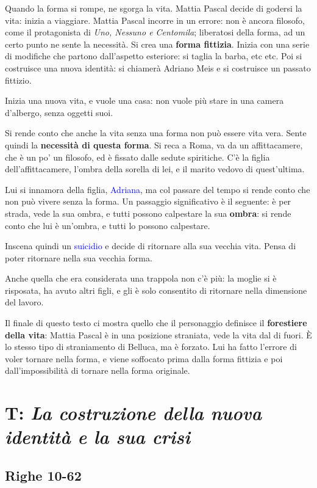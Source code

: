 \documentclass[a4paper, twoside, titlepage]{book}
\newcounter{mar}
\renewcommand{\emph}[1]{\textcolor{blue}{#1}}
\begin{document}
Quando la forma si rompe, ne sgorga la vita. Mattia Pascal decide di godersi la vita: inizia a viaggiare.
Mattia Pascal incorre in un errore: non è ancora filosofo, come il protagonista di \textit{Uno, Nessuno e Centomila}; liberatosi della forma, ad un certo punto ne sente la necessità. Si crea una \textbf{forma fittizia}.
Inizia con una serie di modifiche che partono dall'aspetto esteriore: si taglia la barba, etc etc.
Poi si costruisce una nuova identità: si chiamerà Adriano Meis e si costruisce un passato fittizio.

Inizia una nuova vita, e vuole una casa: non vuole più stare in una camera d'albergo, senza oggetti suoi.

Si rende conto che anche la vita senza una forma non può essere vita vera. Sente quindi la \textbf{necessità di questa forma}.
Si reca a Roma, va da un affittacamere, che è un po' un filosofo, ed è fissato dalle sedute spiritiche.
C'è la figlia dell'affittacamere, l'ombra della sorella di lei, e il marito vedovo di quest'ultima.

Lui si innamora della figlia, \emph{Adriana}, ma col passare del tempo si rende conto che non può vivere senza la forma. Un passaggio significativo è il seguente: è per strada, vede la sua ombra, e tutti possono calpestare la sua \textbf{ombra}: si rende conto che lui è un'ombra, e tutti lo possono calpestare.

Inscena quindi un \emph{suicidio} e decide di ritornare alla sua vecchia vita. Pensa di poter ritornare nella sua vecchia forma.

Anche quella che era considerata una trappola non c'è più: la moglie si è risposata, ha avuto altri figli, e gli è solo consentito di ritornare nella dimensione del lavoro.


Il finale di questo testo ci mostra quello che il personaggio definisce il \textbf{forestiere della vita}: Mattia Pascal è in una posizione straniata, vede la vita dal di fuori. È lo stesso tipo di straniamento di Belluca, ma è forzato.
Lui ha fatto l'errore di voler tornare nella forma, e viene soffocato prima dalla forma fittizia e poi dall'impossibilità di tornare nella forma originale.

\section{T: \textit{La costruzione della nuova identità e la sua crisi}}

\subsection*{Righe 10-62}
\end{document}
